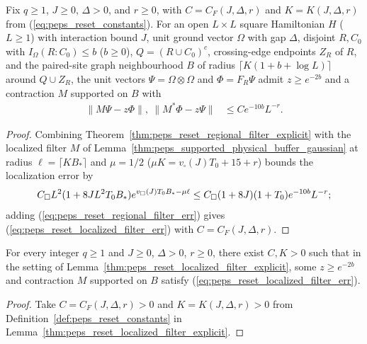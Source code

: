 \begin{lemma}
    \label{thm:peps_reset_localized_filter_explicit}
    \leanok
    Fix $q\ge1$, $J\ge0$, $\Delta>0$, and $r\ge0$, with $C=C_F(J,\Delta,r)$ and $K=K(J,\Delta,r)$ from (\ref{eq:peps_reset_constants}). For an open $L\times L$ square Hamiltonian $H$ ($L\ge1$) with interaction bound $J$, unit ground vector $\Omega$ with gap $\Delta$, disjoint $R,C_0$ with $I_\Omega(R:C_0)\le b$ ($b\ge0$), $Q=(R\cup C_0)^c$, crossing-edge endpoints $Z_R$ of $R$, and the paired-site graph neighbourhood $B$ of radius $\lceil K(1+b+\log L)\rceil$ around $Q\cup Z_R$, the unit vectors $\Psi=\Omega\otimes\Omega$ and $\Phi=F_R\Psi$ admit $z\ge e^{-2b}$ and a contraction $M$ supported on $B$ with
    \begin{align}
        \|M\Psi-z\Phi\|,\ \|M^*\Phi-z\Psi\| & \le Ce^{-10b}L^{-r}.
        \label{eq:peps_reset_localized_filter_err}
    \end{align}
\end{lemma}
\begin{proof}
    \leanok
    Combining Theorem~\ref{thm:peps_reset_regional_filter_explicit} with the localized filter $M$ of Lemma~\ref{thm:peps_supported_physical_buffer_gaussian} at radius $\ell=\lceil KB_*\rceil$ and $\mu=1/2$ ($\mu K=v_\square(J)T_0+15+r$) bounds the localization error by
    \begin{align}
        C_\square L^2(1+8JL^2T_0B_*)e^{v_\square(J)T_0B_*-\mu\ell}
        \le C_\square(1+8J)(1+T_0)e^{-10b}L^{-r}; \notag
    \end{align}
    adding (\ref{eq:peps_reset_regional_filter_err}) gives (\ref{eq:peps_reset_localized_filter_err}) with $C=C_F(J,\Delta,r)$.
\end{proof}

\begin{lemma}
    \label{thm:peps_reset_localized_filter}
    \leanok
    For every integer $q\ge1$ and $J\ge0$, $\Delta>0$, $r\ge0$, there exist $C,K>0$ such that in the setting of Lemma~\ref{thm:peps_reset_localized_filter_explicit}, some $z\ge e^{-2b}$ and contraction $M$ supported on $B$ satisfy (\ref{eq:peps_reset_localized_filter_err}).
\end{lemma}
\begin{proof}
    \leanok
    Take $C=C_F(J,\Delta,r)>0$ and $K=K(J,\Delta,r)>0$ from Definition~\ref{def:peps_reset_constants} in Lemma~\ref{thm:peps_reset_localized_filter_explicit}.
\end{proof}

